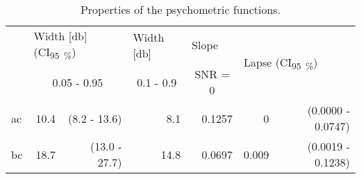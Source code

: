 \begin{table}[H]
\caption{Properties of the psychometric functions.}
\label{tab:psych}
\centering
\begin{tabular}{l|rrrrlr}
\multirow{2}{*}{} & \multicolumn{2}{l}{Width [\si{\decibel}] (CI\textsubscript{\SI{95}{\percent}})} & \multicolumn{1}{l}{Width [\si{\decibel}]} & \multicolumn{1}{l}{Slope}   & \multicolumn{2}{l}{\multirow{2}{*}{Lapse (CI\textsubscript{\SI{95}{\percent}})}} \\
                           & \multicolumn{2}{c}{0.05 - 0.95}                                                 & \multicolumn{1}{c}{0.1 - 0.9}             & \multicolumn{1}{c}{SNR = 0} & \multicolumn{2}{l}{}                                                             \\ \hline
\gls{ac}         & 10.4                               & (8.2 - 13.6)                                & 8.1                                       & 0.1257                      & \multicolumn{1}{r}{0}                       & (0.0000 - 0.0747)                  \\
\gls{bc}         & 18.7                               & (13.0 - 27.7)                               & 14.8                                      & 0.0697                      & \multicolumn{1}{r}{0.009}                   & (0.0019 - 0.1238)                 
\end{tabular}
\end{table}

